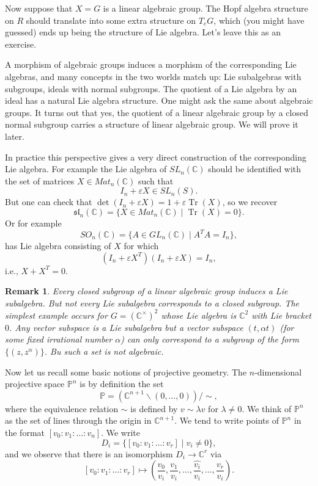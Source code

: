 \documentclass[12pt]{article}
\theoremstyle{plain}
\newtheorem{rem}[thm]{Remark}
\theoremstyle{definition}
\numberwithin{equation}{section}
\DeclareMathOperator{\tr}{Tr}
\newcommand{\al}{\alpha}
\newcommand{\C}{\mathbb{C}}
\newcommand{\bbP}{\mathbb{P}}
\begin{document}
Now suppose that $X = G$ is a linear algebraic group. The Hopf algebra structure on $R$ should translate into some extra structure on $T_eG$, which (you might have guessed) ends up being the structure of Lie algebra. Let's leave this as an exercise.

A morphism of algebraic groups induces a morphism of the corresponding Lie algebras, and many concepts in the two worlds match up: Lie subalgebras with subgroups, ideals with normal subgroups. The quotient of a Lie algebra by an ideal has a natural Lie algebra structure. One might ask the same about algebraic groups. It turns out that yes, the quotient of a linear algebraic group by a closed normal subgroup carries a structure of linear algebraic group. We will prove it later.


In practice this perspective gives a very direct construction of the corresponding Lie algebra. For example the Lie algebra of $SL_n(\C)$ should be identified with the set of matrices $X \in Mat_{n}(\C)$ such that
\[
I_n + \varepsilon X \in SL_n(S).
\]
But one can check that $\det(I_n + \varepsilon X) = 1 + \varepsilon \tr(X)$, so we recover
\[
\mathfrak{sl}_n(\C) = \{X \in Mat_{n}(\C) \mid \tr(X) = 0 \}.
\]
Or for example
\[
SO_n(\C) = \{A \in GL_n(\C) \mid A^TA = I_n \},
\]
has Lie algebra consisting of $X$ for which
\[
(I_n + \varepsilon X^T) (I_n + \varepsilon X) = I_n,
\]
i.e., $X + X^T = 0$.


\begin{rem}
Every closed subgroup of a linear algebraic group induces a Lie subalgebra. But not every Lie subalgebra corresponds to a closed subgroup. The simplest example occurs for $G = (\C^\times)^2$ whose Lie algebra is $\C^2$ with Lie bracket $0$. Any vector subspace is a Lie subalgebra but a vector subspace $(t, \alpha t)$ (for some fixed irrational number $\al$) can only correspond to a subgroup of the form $\{(z, z^\al)\}$. Bu such a set is not algebraic.
\end{rem}




Now let us recall some basic notions of projective geometry. The $n$-dimensional projective space $\bbP^n$ is by definition the set
\[
\bbP = (\C^{n+1} \backslash (0, \ldots, 0)) / \sim,
\]
where the equivalence relation $\sim$ is defined by $v \sim \lambda v$ for $\lambda \neq 0$. We think of $\bbP^n$ as the set of lines through the origin in $\C^{n+1}$. We tend to write points of $\bbP^n$ in the format $[v_0 : v_1 : \ldots : v_n]$. We write
\[
D_i = \{[v_0 : v_1 : \ldots : v_r] \mid v_i \neq 0\},
\]
and we observe that there is an isomorphism $D_i \rightarrow \C^r$ via
\[
[v_0 : v_1 : \ldots : v_r] \mapsto (\frac{v_0}{v_i}, \frac{v_1}{v_i}, \ldots, \widehat{\frac{v_i}{v_i}}, \ldots, \frac{v_r}{v_i}).
\]
\end{document}
